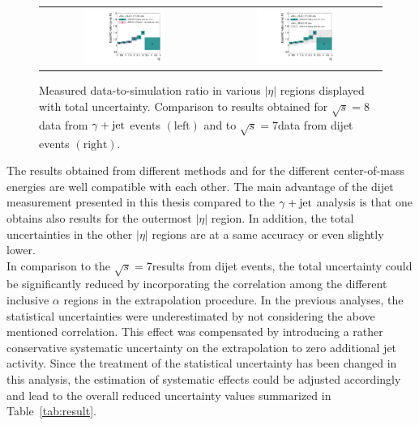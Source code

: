 \begin{figure}[!h]
  \centering
  \begin{tabular}{cc}
                \includegraphics[width=0.49\textwidth]{figures/JER_2012_compPhoton_final_combination_v1.pdf} &
                \includegraphics[width=0.49\textwidth]{figures/JER_2012_comp2011_final_combination_v1.pdf}
  \end{tabular}
  \caption{Measured data-to-simulation ratio in various $|\eta|$ regions displayed with total uncertainty. Comparison to results obtained for $\sqrt{s}=8$\tev data from $\gamma +\rm{jet}$ events $(\mathrm{left})$ and to $\sqrt{s}=7$\tev data from dijet events $(\mathrm{right})$.}
  \label{fig:result_comparison}
\end{figure}

The results obtained from different methods and for the different center-of-mass energies are well compatible with each other. The main advantage of the dijet measurement presented in this thesis compared to the $\gamma +\rm{jet}$ analysis is that one obtains also results for the outermost $|\eta|$ region. In addition, the total uncertainties in the other $|\eta|$ regions are at a same accuracy or even slightly lower. \\
In comparison to the $\sqrt{s}=7$\tev results from dijet events, the total uncertainty could be significantly reduced by incorporating the correlation among the different inclusive $\alpha$ regions in the extrapolation procedure. In the previous analyses, the statistical uncertainties were underestimated by not considering the above mentioned correlation. This effect was compensated by introducing a rather conservative systematic uncertainty on the extrapolation to zero additional jet activity. Since the treatment of the statistical uncertainty has been changed in this analysis, the estimation of systematic effects could be adjusted accordingly and lead to the overall reduced uncertainty values summarized in Table~\ref{tab:result}.

